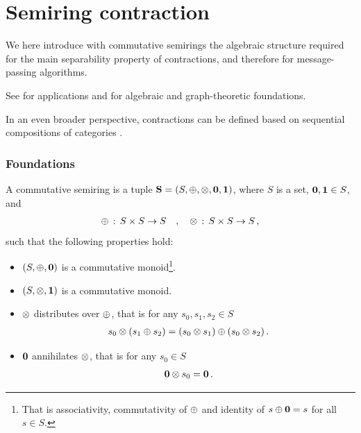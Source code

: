\chapter{Semiring contraction}


%

We here introduce with commutative semirings the algebraic structure required for the main separability property of contractions, and therefore for message-passing algorithms.

See \cite{liu_computing_2023,liu_tropical_2021} for applications and \cite{gondran_graphs_2008} for algebraic and graph-theoretic foundations.

In an even broader perspective, contractions can be defined based on sequential compositions of categories \cite{tull_towards_2024}.

\subsection{Foundations}

\begin{definition}
    A commutative semiring is a tuple $\mathbf{S}=(S,\oplus,\otimes,\mathbf{0},\mathbf{1})$, where $S$ is a set, $\mathbf{0},\mathbf{1}\in S$, and
    \begin{align*}
        \oplus \,:\, S \times S \rightarrow S
        \quad, \quad
        \otimes \,:\, S \times S \rightarrow S \, ,
    \end{align*}
    such that the following properties hold:
    \begin{itemize}
        \setlength{\labelwidth}{1.8em}
        \setlength{\leftmargin}{1.8em}
        \setlength{\itemindent}{0em}
        \item[(i)] $(S,\oplus,\mathbf{0})$ is a commutative monoid\footnote{That is associativity, commutativity of $\oplus$ and identity of $s\oplus \mathbf{0}=s$ for all $s\in S$.}.
        \item[(ii)] $(S,\otimes,\mathbf{1})$ is a commutative monoid.
        \item[(iii)] $\otimes$ distributes over $\oplus$, that is for any $s_0,s_1,s_2\in S$
        \begin{align*}
            s_0 \otimes (s_1 \oplus s_2)
            = (s_0 \otimes s_1) \oplus (s_0 \otimes s_2) \, .
        \end{align*}
        \item[(iv)] $\mathbf{0}$ annihilates $\otimes$, that is for any $s_0\in S$
        \begin{align*}
            \mathbf{0} \otimes s_0 = \mathbf{0} \, .
        \end{align*}
    \end{itemize}
\end{definition}

